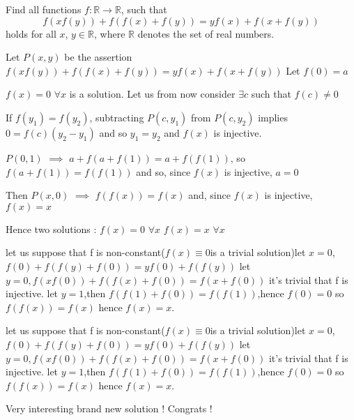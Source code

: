 \begin{solution}
	\begin{tcolorbox}Find all functions $ f: \mathbb{R} \to \mathbb{R}$, such that
\[ f(xf(y)) + f(f(x) + f(y)) = yf(x) + f(x + f(y))\]
holds for all $ x$, $ y \in \mathbb{R}$, where $ \mathbb{R}$ denotes the set of real numbers.\end{tcolorbox}

Let $ P(x,y)$ be the assertion $ f(xf(y))+f(f(x)+f(y))=yf(x)+f(x+f(y))$
Let $ f(0)=a$

$ f(x)=0$ $ \forall x$ is a solution. Let us from now consider $ \exists c$ such that $ f(c)\neq 0$

If $ f(y_1)=f(y_2)$, subtracting $ P(c,y_1)$ from $ P(c,y_2)$ implies $ 0=f(c)(y_2-y_1)$ and so $ y_1=y_2$ and $ f(x)$ is injective.

$ P(0,1)$ $ \implies$ $ a+f(a+f(1))=a+f(f(1))$, so $ f(a+f(1))=f(f(1))$ and so, since $ f(x)$ is injective, $ a=0$

Then $ P(x,0)$ $ \implies$ $ f(f(x))=f(x)$ and, since $ f(x)$ is injective, $ f(x)=x$

Hence two solutions :
$ f(x)=0$ $ \forall x$
$ f(x)=x$ $ \forall x$
\end{solution}



\begin{solution}
	let us suppose that f is non-constant($f(x)\equiv 0 $is a trivial solution)let $x=0$,$f(0)+f(f(y)+f(0))=yf(0)+f(f(y))$
let $y=0,f(xf(0))+f(f(x)+f(0))=f(x+f(0))$
it's trivial that f is injective.
let $y=1$,then $f(f(1)+f(0))=f(f(1))$,hence $f(0)=0$
so $f(f(x))=f(x)$ hence $f(x)=x$.
\end{solution}



\begin{solution}
	\begin{tcolorbox}let us suppose that f is non-constant($f(x)\equiv 0 $is a trivial solution)let $x=0$,$f(0)+f(f(y)+f(0))=yf(0)+f(f(y))$
let $y=0,f(xf(0))+f(f(x)+f(0))=f(x+f(0))$
it's trivial that f is injective.
let $y=1$,then $f(f(1)+f(0))=f(f(1))$,hence $f(0)=0$
so $f(f(x))=f(x)$ hence $f(x)=x$.\end{tcolorbox}
Very interesting brand new solution !
Congrats !
\end{solution}



